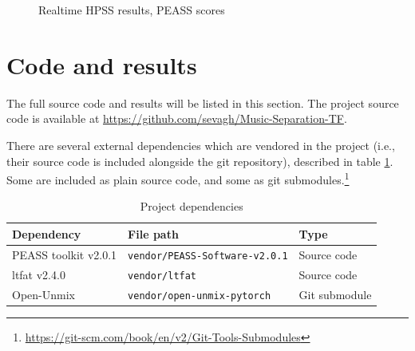 \documentclass[letter,12pt]{article}
\begin{document}
\begin{appendices}
\begin{figure}[ht]
	\centering
	\caption{Realtime HPSS results, PEASS scores}
	\label{fig:rtresults}
\end{figure}

\vfill
\clearpage

\section{Code and results}
\label{appendix:listings}

The full source code and results will be listed in this section. The project source code is available at \href{https://github.com/sevagh/Music-Separation-TF}{https://github.com/sevagh/Music-Separation-TF}.

There are several external dependencies which are vendored in the project (i.e., their source code is included alongside the git repository), described in table \ref{table:deps}. Some are included as plain source code, and some as git submodules.\footnote{\url{https://git-scm.com/book/en/v2/Git-Tools-Submodules}}

\begin{table}[ht]
	\centering
\begin{tabular}{ |l|l|l| }
	 \hline
	  Dependency & File path & Type \\
	 \hline
	 \hline
	 PEASS toolkit v2.0.1 & \Verb#vendor/PEASS-Software-v2.0.1# & Source code \\
	 \hline
	 ltfat v2.4.0 & \Verb#vendor/ltfat# & Source code \\
	 \hline
	 Open-Unmix & \Verb#vendor/open-unmix-pytorch# & Git submodule \\
	 \hline
\end{tabular}
	\caption{Project dependencies}
	\label{table:deps}
\end{table}


\end{appendices}
\end{document}
